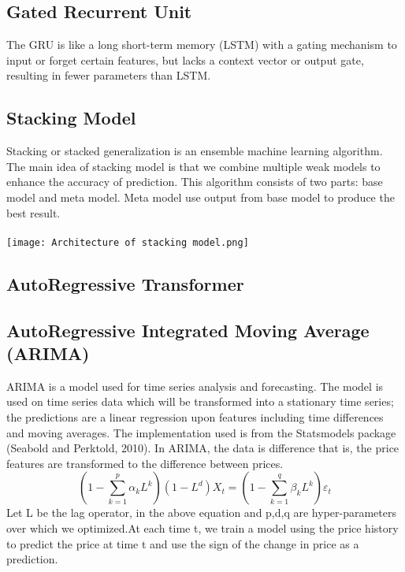 \documentclass{ieeeojies}
\begin{document}
\subsection{Gated Recurrent Unit}
The GRU is like a long short-term memory (LSTM) with a gating mechanism to input or forget certain features, but lacks a context vector or output gate, resulting in fewer parameters than LSTM.
\subsection{Stacking Model}
Stacking or stacked generalization is an ensemble machine learning algorithm. The main idea of stacking model is that we combine multiple weak models to enhance the accuracy of prediction. This algorithm consists of two parts: base model and meta model. Meta model use output from base model to produce the best result.\\ \\
\texttt{[image: Architecture of stacking model.png]}
\subsection{AutoRegressive Transformer}

\subsection{AutoRegressive Integrated
Moving Average (ARIMA)} 
ARIMA is a model used for time series analysis and forecasting. The model is used on time series data which will be transformed into a stationary time series; the predictions are a linear regression upon features including time differences and moving averages. The implementation used is from the Statsmodels package (Seabold and Perktold, 2010). In ARIMA, the data is difference that is, the price features are transformed to the difference between prices.
\begin{equation*}
(1 - \sum_{k=1}^{p} \alpha_k L^k)(1 - L^d)X_t = (1 - \sum_{k=1}^{q} \beta_k L^k) \varepsilon_t
\end{equation*}
Let L be the lag operator, in the above equation and p,d,q are hyper-parameters over which we optimized.At each time t, we train a model using the price history to predict the price at time t and use the sign of the change in price as a prediction.
\end{document}
